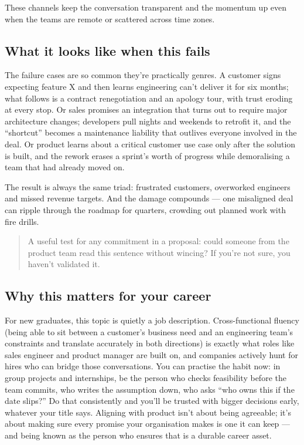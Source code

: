 These channels keep the conversation transparent and the momentum up even when the teams are remote or scattered across time zones.



\subsection{What it looks like when this fails}


The failure cases are so common they're practically genres. A customer signs expecting feature X and then learns engineering can't deliver it for six months; what follows is a contract renegotiation and an apology tour, with trust eroding at every stop. Or sales promises an integration that turns out to require major architecture changes; developers pull nights and weekends to retrofit it, and the ``shortcut'' becomes a maintenance liability that outlives everyone involved in the deal. Or product learns about a critical customer use case only after the solution is built, and the rework erases a sprint's worth of progress while demoralising a team that had already moved on.


The result is always the same triad: frustrated customers, overworked engineers and missed revenue targets. And the damage compounds — one misaligned deal can ripple through the roadmap for quarters, crowding out planned work with fire drills.



\begin{quote}\small
A useful test for any commitment in a proposal: could someone from the product team read this sentence without wincing? If you're not sure, you haven't validated it.
\end{quote}



\subsection{Why this matters for your career}


For new graduates, this topic is quietly a job description. Cross-functional fluency (being able to sit between a customer's business need and an engineering team's constraints and translate accurately in both directions) is exactly what roles like sales engineer and product manager are built on, and companies actively hunt for hires who can bridge those conversations. You can practise the habit now: in group projects and internships, be the person who checks feasibility before the team commits, who writes the assumption down, who asks ``who owns this if the date slips?'' Do that consistently and you'll be trusted with bigger decisions early, whatever your title says. Aligning with product isn't about being agreeable; it's about making sure every promise your organisation makes is one it can keep — and being known as the person who ensures that is a durable career asset.

